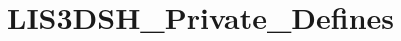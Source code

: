 \hypertarget{group__LIS3DSH__Private__Defines}{\section{L\-I\-S3\-D\-S\-H\-\_\-\-Private\-\_\-\-Defines}
\label{group__LIS3DSH__Private__Defines}
}
